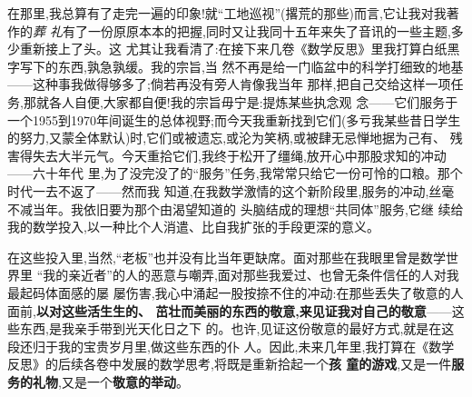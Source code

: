 在那里,我总算有了走完一遍的印象!就“工地巡视”(撂荒的那些)而言,它让我对我著作的\emph{葬
礼}有了一份原原本本的把握,同时又让我同十五年来失了音讯的一些主题,多少重新接上了头。这
尤其让我看清了:在接下来几卷《数学反思》里我打算白纸黑字写下的东西,孰急孰缓。我的宗旨,当
然不再是给一门临盆中的科学打细致的地基——这种事我做得够多了;倘若再没有旁人肯像我当年
那样,把自己交给这样一项任务,那就各人自便,大家都自便!我的宗旨毋宁是:提炼某些执念观
念——它们服务于一个1955到1970年间诞生的总体视野;而今天我重新找到它们(多亏我某些昔日学生的努力,又蒙全体默认)时,它们或被遗忘,或沦为笑柄,或被肆无忌惮地据为己有、
残害得失去大半元气。今天重拾它们,我终于松开了缰绳,放开心中那股求知的冲动——六十年代
里,为了没完没了的“服务”任务,我常常只给它一份可怜的口粮。那个时代一去不返了——然而我
知道,在我数学激情的这个新阶段里,服务的冲动,丝毫不减当年。我依旧要为那个由渴望知道的
头脑结成的理想“共同体”服务,它继
续给我的数学投入,以一种比个人消遣、比自我扩张的手段更深的意义。

\pmark{}在这些投入里,当然,“老板”也并没有比当年更缺席。面对那些在我眼里曾是数学世界里
“我的亲近者”的人的恶意与嘲弄,面对那些我爱过、也曾无条件信任的人对我最起码体面感的屡
屡伤害,我心中涌起一股按捺不住的冲动:在那些丢失了敬意的人面前,\textbf{以对这些活生生的、
茁壮而美丽的东西的敬意,来见证我对自己的敬意}——这些东西,是我亲手带到光天化日之下
的。也许,见证这份敬意的最好方式,就是在这段还归于我的宝贵岁月里,做这些东西的仆
人。因此,未来几年里,我打算在《数学反思》的后续各卷中发展的数学思考,将既是重新拾起一个\textbf{孩
童的游戏},又是一件\textbf{服务的礼物},又是一个\textbf{敬意的举动}。

